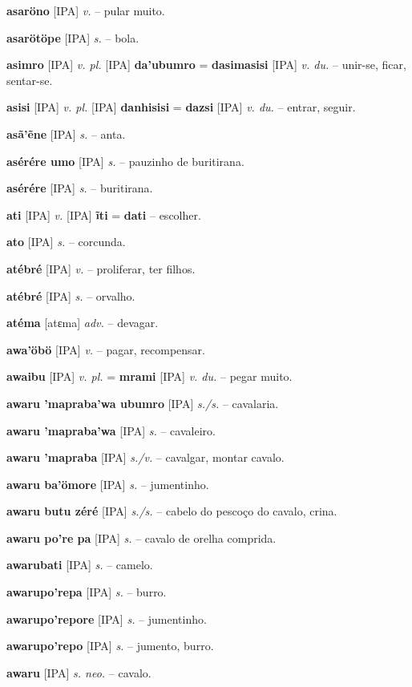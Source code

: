\textbf{asaröno} [IPA] \textit{v.} -- pular muito.

\textbf{asarötöpe} [IPA] \textit{s.} -- bola.

\textbf{asimro} [IPA] \textit{v. pl.} [IPA] \textbf{da'ubumro} = \textbf{dasimasisi} [IPA] \textit{v. du.} -- unir-se, ficar, sentar-se.

\textbf{asisi} [IPA] \textit{v. pl.} [IPA] \textbf{danhisisi} = \textbf{dazsi} [IPA] \textit{v. du.} -- entrar, seguir.

\textbf{asã'ẽne} [IPA] \textit{s.} -- anta.

\textbf{asérére umo} [IPA] \textit{s.} -- pauzinho de buritirana.

\textbf{asérére} [IPA] \textit{s.} -- buritirana.

\textbf{ati} [IPA] \textit{v.} [IPA] \textbf{ĩti} = \textbf{dati} -- escolher.

\textbf{ato} [IPA] \textit{s.} -- corcunda.

\textbf{atébré } [IPA] \textit{v.} -- proliferar, ter filhos.

\textbf{atébré} [IPA] \textit{s.} -- orvalho.

\textbf{atéma} [atɛma] \textit{adv.} -- devagar.

\textbf{awa'öbö} [IPA] \textit{v.} -- pagar, recompensar.

\textbf{awaibu} [IPA] \textit{v. pl.} = \textbf{mrami} [IPA] \textit{v. du.} -- pegar muito.

\textbf{awaru 'mapraba'wa ubumro} [IPA] \textit{s./s.} -- cavalaria.

\textbf{awaru 'mapraba'wa} [IPA] \textit{s.} -- cavaleiro.

\textbf{awaru 'mapraba} [IPA] \textit{s./v.} -- cavalgar, montar cavalo.

\textbf{awaru ba'ömore} [IPA] \textit{s.} -- jumentinho.

\textbf{awaru butu zéré} [IPA] \textit{s./s.} -- cabelo do pescoço do cavalo, crina.

\textbf{awaru po're pa} [IPA] \textit{s.} -- cavalo de orelha comprida.

\textbf{awarubati} [IPA] \textit{s.} -- camelo.

\textbf{awarupo'repa} [IPA] \textit{s.} -- burro.

\textbf{awarupo'repore} [IPA] \textit{s.} -- jumentinho.

\textbf{awarupo'repo} [IPA] \textit{s.} -- jumento, burro.

\textbf{awaru} [IPA] \textit{s. neo.} -- cavalo.

